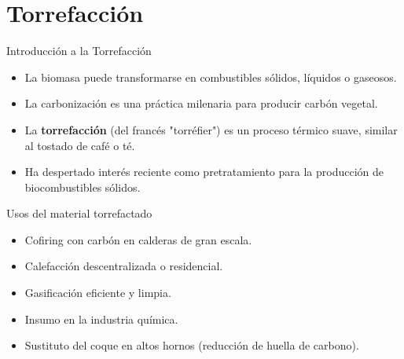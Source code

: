 \documentclass[main.tex]{subfiles}
\begin{document}
\section{Torrefacción}

\begin{frame}{Introducción a la Torrefacción}
\footnotesize
  \begin{itemize}
    \item La biomasa puede transformarse en combustibles sólidos, líquidos o gaseosos.
    \item La carbonización es una práctica milenaria para producir carbón vegetal.
    \item La \textbf{torrefacción} (del francés "torréfier") es un proceso térmico suave, similar al tostado de café o té.
    \item Ha despertado interés reciente como pretratamiento para la producción de biocombustibles sólidos.
  \end{itemize}
  \begin{block}{Usos del material torrefactado}
  \justifying
    \begin{itemize}
      \item Cofiring con carbón en calderas de gran escala.
      \item Calefacción descentralizada o residencial.
      \item Gasificación eficiente y limpia.
      \item Insumo en la industria química.
      \item Sustituto del coque en altos hornos (reducción de huella de carbono).
    \end{itemize}
  \end{block}
\end{frame}
\end{document}
